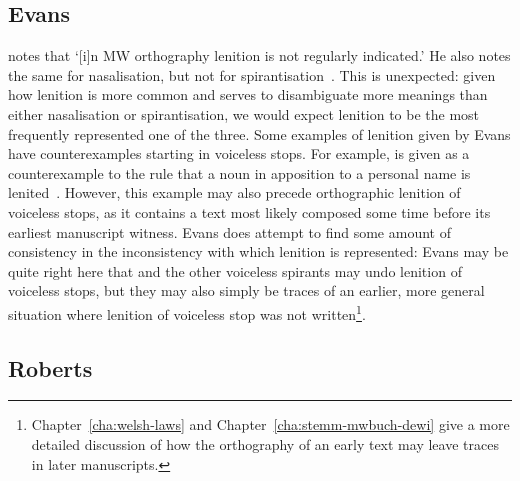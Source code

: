 \subsection{Evans}
\label{sec:evans}

\Textcite[§~18]{evans_grammar_1964} notes that `[i]n MW orthography lenition is not regularly indicated.' He also notes the same for nasalisation, but not for spirantisation~\autocite[§§~24--25]{evans_grammar_1964}. This is unexpected: given how lenition is  more common and serves to disambiguate more meanings than either nasalisation or spirantisation, we would expect lenition to be the most frequently represented one of the three. Some examples of lenition given by Evans have counterexamples starting in voiceless stops. For example,  is given as a counterexample to the rule that a noun in apposition to a personal name is lenited~\autocite[§~19]{evans_grammar_1964}. However, this example may also precede orthographic lenition of voiceless stops, as it contains a text most likely composed some time before its earliest manuscript witness. Evans does attempt to find some amount of consistency in the inconsistency with which lenition is represented:
Evans may be quite right here that  and the other voiceless spirants may undo lenition of voiceless stops, but they may also simply be traces of an earlier, more general situation where lenition of voiceless stop was not written\footnote{Chapter~\ref{cha:welsh-laws} and Chapter~\ref{cha:stemm-mwbuch-dewi} give a more detailed discussion of how the orthography of an early text may leave traces in later manuscripts.}.

\subsection{Roberts}
\label{sec:roberts}


